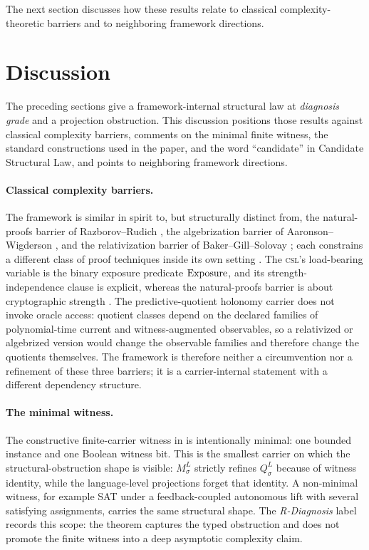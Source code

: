 \documentclass[11pt]{article}
\newcommand{\CSL}{\textsc{csl}}            \newcommand{\CSLcore}{Candidate Structural Law}
\newcommand{\Substrate}{\sigma}             \newcommand{\Lift}{L}                       \newcommand{\LiftState}{\sigma_{L}}         \newcommand{\HistorySpace}{H_{\Substrate}^{\Lift}}
\newcommand{\Qquotient}{Q_{\Substrate}^{\Lift}}
\newcommand{\Mquotient}{M_{\Substrate}^{\Lift}}
\newcommand{\DiagnosisGrade}{\emph{diagnosis grade}}
\newcommand{\RDiagnosis}{\emph{R-Diagnosis}}
\theoremstyle{definition}
\begin{document}
The next section discusses how these results relate to classical
complexity-theoretic barriers and to neighboring framework directions.
 

\section{Discussion}
\label{sec:discussion}

The preceding sections give a framework-internal structural law at
\DiagnosisGrade{} and a projection obstruction.  This discussion
positions those results against classical complexity barriers, comments
on the minimal finite witness, the standard constructions used in the
paper, and the word ``candidate'' in \CSLcore{}, and points to
neighboring framework directions.

\paragraph{Classical complexity barriers.}
The framework is similar in spirit to, but structurally distinct from,
the natural-proofs barrier of Razborov--Rudich
\citep{RazborovRudich1997NaturalProofs}, the algebrization barrier of
Aaronson--Wigderson \citep{AaronsonWigderson2009Algebrization}, and the
relativization barrier of Baker--Gill--Solovay
\citep{BakerGillSolovay1975Relativization}; each constrains a different
class of proof techniques inside its own setting
\citep{Wigderson2019MathematicsComputation,Aaronson2016PNP}.  The
\CSL{}'s load-bearing variable is the binary exposure predicate
\(\operatorname{Exposure}\), and its strength-independence clause is explicit,
whereas the natural-proofs barrier is about cryptographic strength
\citep{GoldreichGoldwasserMicali1986RandomFunctions,HastadImpagliazzoLevinLuby1999PRG}.
The predictive-quotient holonomy carrier does not invoke oracle access:
quotient classes depend on the declared families of polynomial-time
current and witness-augmented observables, so a relativized or
algebrized version would change the observable families and therefore
change the quotients themselves.  The framework is therefore neither a
circumvention nor a refinement of these three barriers; it is a
carrier-internal statement with a different dependency structure.

\paragraph{The minimal witness.}
The constructive finite-carrier witness in
 is intentionally minimal: one bounded
instance and one Boolean witness bit.  This is the smallest carrier on
which the structural-obstruction shape is visible: \(\Mquotient\)
strictly refines \(\Qquotient\) because of witness identity, while the
language-level projections forget that identity.  A non-minimal
witness, for example SAT under a feedback-coupled autonomous lift with
several satisfying assignments, carries the same structural shape.
The \RDiagnosis{} label records this scope: the theorem captures the
typed obstruction and does not promote the finite witness into a deep
asymptotic complexity claim.
\end{document}
